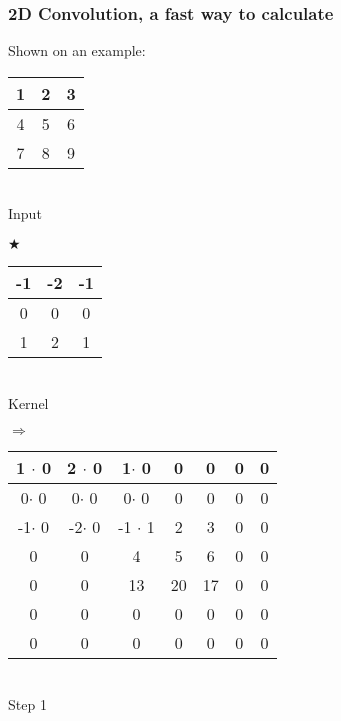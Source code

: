 \subsubsection{2D Convolution, a fast way to calculate}
Shown on an example: \\
	\begin{minipage}{2.1cm}
	\centering
		\begin{tabular}{|c|c|c|} \hline
			1 & 2 & 3 \\ \hline
	      	4 & 5 & 6 \\ \hline
	      	7 & 8 & 9 \\ \hline
	      \end{tabular} \\ 
	      Input
	\end{minipage}
	\begin{minipage}{0.3cm}
		$\bigstar$
	\end{minipage}
	\begin{minipage}{2.5cm}
	\centering
		\begin{tabular}{|c|c|c|} \hline
			\rowcolor{lightgray} -1 & -2 & -1 \\ \hline
	      	\cellcolor{lightgray} 0 & \cellcolor{gray} 0 & \cellcolor{lightgray} 0 \\ \hline
	      	\rowcolor{lightgray} 1 & 2 & 1 \\ \hline
	      \end{tabular}\\
	      Kernel
	\end{minipage}
	\begin{minipage}{0.3cm}
	\centering
			$\Rightarrow$
		\end{minipage}
	\begin{minipage}{7cm}
	\centering
		\begin{tabular}{|c|c|c|c|c|c|c|} \hline
			\cellcolor{lightgray} 1 $\cdot$ 0 & \cellcolor{lightgray} 2 $\cdot$ 0& \cellcolor{lightgray} 1$\cdot$ 0 & 0 & 0 & 0 & 0  \\ \hline
		 	\cellcolor{lightgray} 0$\cdot$ 0 & \cellcolor{gray} 0$\cdot$ 0  & \cellcolor{lightgray} 0$\cdot$ 0 & 0& 0 & 0 & 0 \\ \hline
	      	 \cellcolor{lightgray} -1$\cdot$ 0 & \cellcolor{lightgray} -2$\cdot$ 0  & \cellcolor{lightgray} -1 $\cdot$ 1 & 2 & 3 & 0 & 0\\ \hline
	      	 0 & 0 & 4 & 5 & 6 & 0 & 0 \\ \hline
	      	 0 & 0 & 13 & 20 & 17& 0 & 0 \\ \hline
	      	 0 & 0 & 0 & 0 & 0 & 0& 0 \\ \hline
	      	 0 & 0 & 0 & 0 & 0 & 0& 0 \\ \hline
	      \end{tabular}\\
	      Step 1
	\end{minipage}
